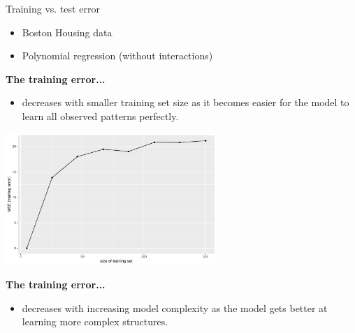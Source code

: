 \documentclass[11pt,compress,t,notes=noshow, xcolor=table]{beamer}
\begin{document}
\begin{vbframe}{Training vs. test error}
\begin{small}
\begin{itemize}
\item Boston Housing data
\item Polynomial regression (without interactions)
\end{itemize}




\textbf{The training error...}
\begin{itemize}
  \item decreases with smaller training set size as it becomes easier for the 
  model to learn all observed patterns perfectly.
\end{itemize}
\end{small}
\begin{center}
\includegraphics[width=0.6\textwidth]{figure/fig-train-vs-test-error-1}
\end{center}

\framebreak

\textbf{The training error...}
\begin{itemize}  
  \item decreases with increasing model complexity as the model gets better at
  learning more complex structures. 
\end{itemize}


\end{vbframe}
\end{document}

